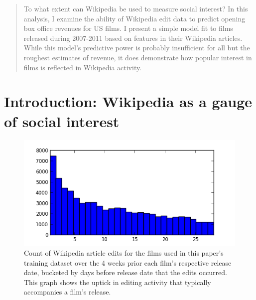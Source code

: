 \documentclass[10pt]{article}
\begin{document}
    \maketitle
    
    \begin{abstract}
        To what extent can Wikipedia be used to measure social interest? In this analysis, I examine the ability of Wikipedia edit data to predict opening box office revenues for US films. I present a simple model fit to films released during 2007-2011 based on features in their Wikipedia articles. While this model's predictive power is probably insufficient for all but the roughest estimates of revenue, it does demonstrate how popular interest in films is reflected in Wikipedia activity. 
    \end{abstract}
    
    \section{Introduction: Wikipedia as a gauge of social interest}
    
    \begin{figure}[ht]
        \centering
        \includegraphics{wikipedia28.png}
        \caption{Count of Wikipedia article edits for the films used in this paper's training dataset over the 4 weeks prior each film's respective release date, bucketed by days before release date that the edits occurred. This graph shows the uptick in editing activity that typically accompanies a film's release.}
        \label{fig:wikipedia-28}
    \end{figure}
    
\end{document}
